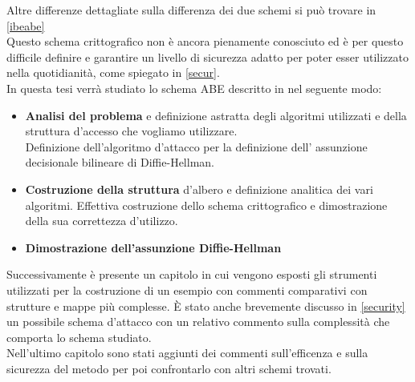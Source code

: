 \newpage

Altre differenze dettagliate sulla differenza dei due schemi si può trovare in \ref{ibeabe}\\[0.2cm]

Questo schema crittografico non è ancora pienamente conosciuto ed è per questo difficile definire e garantire un livello di sicurezza adatto per poter esser utilizzato nella quotidianità, come spiegato in \ref{secur}.\\[0.2cm]

In questa tesi verrà studiato lo schema ABE descritto in \cite{kpabe} nel seguente modo:
\begin{itemize}
	\item \textbf{Analisi del problema} e definizione astratta degli algoritmi utilizzati e della struttura d'accesso che vogliamo utilizzare.\\
	Definizione dell'algoritmo d'attacco per la definizione dell' assunzione decisionale bilineare di Diffie-Hellman.
	\item \textbf{Costruzione della struttura} d'albero e definizione analitica dei vari algoritmi. Effettiva costruzione dello schema crittografico e dimostrazione della sua correttezza d'utilizzo.
	\item \textbf{Dimostrazione dell'assunzione Diffie-Hellman}
\end{itemize}
\vspace{0.4cm}

Successivamente è presente un capitolo in cui vengono esposti gli strumenti utilizzati per la costruzione di un esempio con commenti comparativi con strutture e mappe più complesse. È stato anche brevemente discusso in \ref{security} un possibile schema d'attacco con un relativo commento sulla complessità che comporta lo schema studiato.\\[0.2cm]

Nell'ultimo capitolo sono stati aggiunti dei commenti sull'efficenza e sulla sicurezza del metodo per poi confrontarlo con altri schemi trovati.


